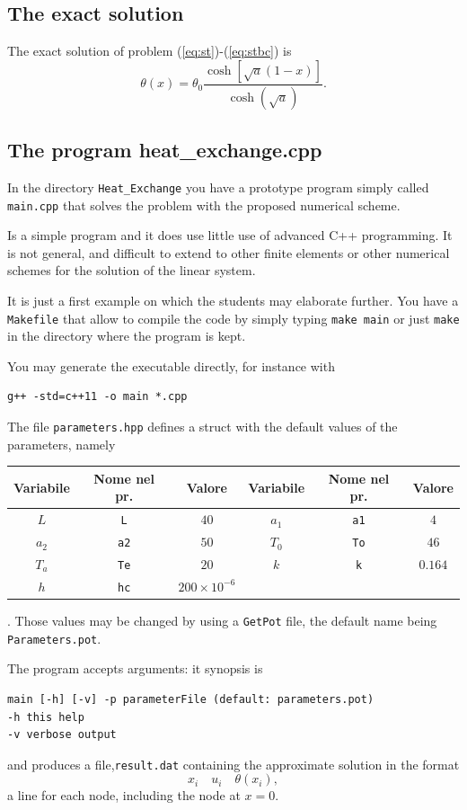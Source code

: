 \documentclass{article}
\begin{document}
\subsection{The exact solution}
The exact solution of problem (\ref{eq:st})-(\ref{eq:stbc})
is
\[
\theta(x)=\theta_0\frac{\cosh[\sqrt{a}(1-x)]}{\cosh(\sqrt{a})}.
\]

\subsection{The program heat\_exchange.cpp}
In the directory \texttt{Heat\_Exchange} you have a prototype program 
simply called 
\texttt{main.cpp} that solves the problem with the proposed numerical scheme. 

Is a simple program and it does use little use of advanced C++ programming.
It is not general, and difficult to extend to other finite elements or other numerical schemes for the solution of the linear system.

It is just a first example on which the students may elaborate further.
You have a \texttt{Makefile} that allow to compile the code by simply 
typing 
\texttt{make main} or just \texttt{make} in the  directory where the program is kept.

You may generate the executable directly, for instance with
\begin{verbatim}
g++ -std=c++11 -o main *.cpp
\end{verbatim}

The file \texttt{parameters.hpp} defines a struct with the default values
of the parameters, namely
\begin{tabular}{ccc|ccc}
\multicolumn{1}{c}{Variabile}&
\multicolumn{1}{c}{Nome nel pr.}&
\multicolumn{1}{c}{Valore}&
\multicolumn{1}{c}{Variabile}&
\multicolumn{1}{c}{Nome nel pr.}&
\multicolumn{1}{c}{Valore}
\\\hline
$L$ &\texttt{L}& $40$ &
$a_1$&\texttt{a1}&$4$\\
$a_2$ &\texttt{a2}& $50$ &
$T_0$&\texttt{To}&$46$\\
$T_a$ &\texttt{Te}& $20$ &
$k$&\texttt{k}&$0.164$\\
$h$ &\texttt{hc}& $200\times 10^{-6}$ &&&\\\hline
\end{tabular}.
Those values may be changed by using a \texttt{GetPot} file, the default
name being \texttt{Parameters.pot}.

The program accepts arguments: it synopsis is
\begin{verbatim}
main [-h] [-v] -p parameterFile (default: parameters.pot)
-h this help
-v verbose output
\end{verbatim}
and produces a file,\texttt{result.dat} containing the approximate solution in the format
\[
x_i\quad u_i\quad \theta(x_i),
\]
a line for each node,  including the node at $x=0$.
\end{document}
